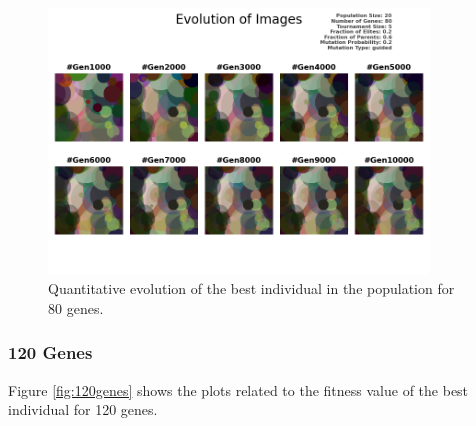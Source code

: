 \documentclass{assignment}
\begin{document}
\begin{figure}[!htb]
    \centering
    \includegraphics[width=0.9\textwidth]{figures/images_output_20_80_5_0.2_0.6_0.2_guided.png}
    \caption{Quantitative evolution of the best individual in the population for 80 genes.}
    \label{fig:80genes_image}
\end{figure}

\subsubsection{120 Genes}
Figure \ref{fig:120genes} shows the plots related to the fitness value of the best individual for 120 genes.
\end{document}
